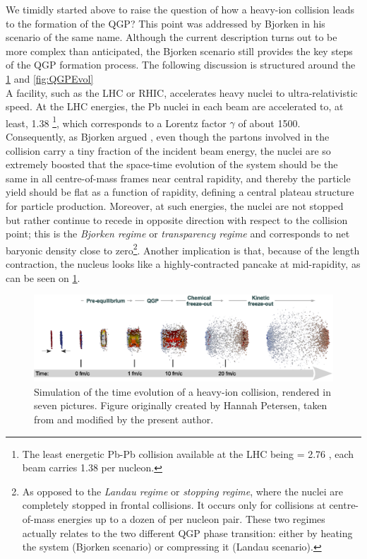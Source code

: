 We timidly started above to raise the question of how a heavy-ion collision leads to the formation of the QGP? This point was addressed by Bjorken in his scenario of the same name. Although the current description turns out to be more complex than anticipated, the Bjorken scenario still provides the key steps of the QGP formation process. The following discussion is structured around the \figs\ref{fig:PbPbSimu} and \ref{fig:QGPEvol}\\

A facility, such as the LHC or RHIC, accelerates heavy nuclei to ultra-relativistic speed. At the LHC energies, the Pb nuclei in each beam are accelerated to, at least, 1.38 \tev\footnote{The least energetic Pb-Pb collision available at the LHC being \sqrtSnn = 2.76 \tev, each beam carries 1.38 \tev per nucleon.}, which corresponds to a Lorentz factor $\gamma$ of about 1500. Consequently, as Bjorken argued \cite{bjorkenHighlyRelativisticNucleusnucleus1983}, even though the partons involved in the collision carry a tiny fraction of the incident beam energy, the nuclei are so extremely boosted that the space-time evolution of the system should be the same in all centre-of-mass frames near central rapidity, and thereby the particle yield should be flat as a function of rapidity, defining a central plateau structure for particle production. Moreover, at such energies, the nuclei are not stopped but rather continue to recede in opposite direction with respect to the collision point; this is the \textit{Bjorken regime} or \textit{transparency regime} and corresponds to net baryonic density close to zero\footnote{As opposed to the \textit{Landau regime} or \textit{stopping regime}, where the nuclei are completely stopped in frontal collisions. It occurs only for collisions at centre-of-mass energies up to a dozen of \gev per nucleon pair. These two regimes actually relates to the two different QGP phase transition: either by heating the system (Bjorken scenario) or compressing it (Landau scenario).}. Another implication is that, because of the length contraction, the nucleus looks like a highly-contracted pancake at mid-rapidity, as can be seen on \fig\ref{fig:PbPbSimu}.\\

\begin{figure}[h]
	\centering
	\hspace*{-2cm}\includegraphics[width=1.35\textwidth]{Figs/Chapter2/PbPbCollision.eps}
	\caption{Simulation of the time evolution of a heavy-ion collision, rendered in seven pictures. Figure originally created by Hannah Petersen, taken from \cite{bernhardBayesianParameterEstimation2018} and modified by the present author.}
	\label{fig:PbPbSimu}
\end{figure}

